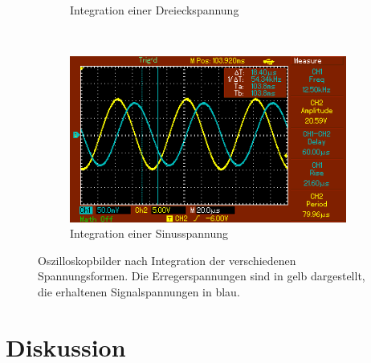 \begin{figure}
\begin{subfigure}{0.49\textwidth}
    \qquad
    \caption{Integration einer Dreieckspannung}
    \label{sub:2}
  \end{subfigure}\\
  \begin{subfigure}{0.49\textwidth}
  \centering
    \includegraphics[width=\textwidth]{sinus.png}
    \qquad
    \caption{Integration einer Sinusspannung}
    \label{sub:3}
  \end{subfigure}
  \caption{Oszilloskopbilder nach Integration der verschiedenen Spannungsformen.
  Die Erregerspannungen sind in gelb dargestellt, die erhaltenen Signalspannungen in blau.}
\label{abb:4}
\end{figure}

\section{Diskussion}
\newpage
\nocite{*}
\printbibliography
